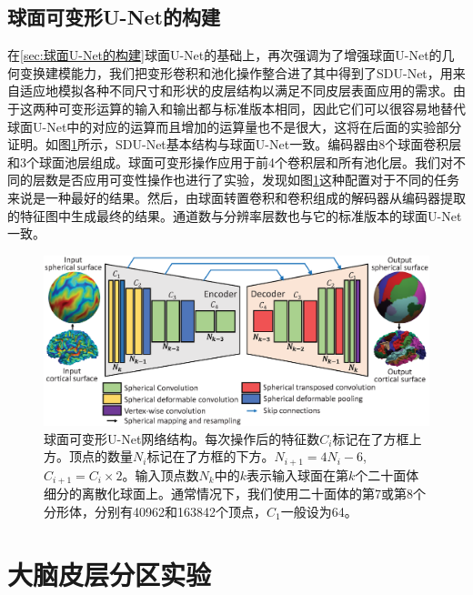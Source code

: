 \subsection{球面可变形U-Net的构建}
在\ref{sec:球面U-Net的构建}球面U-Net的基础上，再次强调为了增强球面U-Net的几何变换建模能力，我们把变形卷积和池化操作整合进了其中得到了SDU-Net，用来自适应地模拟各种不同尺寸和形状的皮层结构以满足不同皮层表面应用的需求。由于这两种可变形运算的输入和输出都与标准版本相同，因此它们可以很容易地替代球面U-Net中的对应的运算而且增加的运算量也不是很大，这将在后面的实验部分证明。如图\ref{fig:fig_sdunet}所示，SDU-Net基本结构与球面U-Net一致。编码器由8个球面卷积层和3个球面池层组成。球面可变形操作应用于前4个卷积层和所有池化层。我们对不同的层数是否应用可变性操作也进行了实验，发现如图\ref{fig:fig_sdunet}这种配置对于不同的任务来说是一种最好的结果。然后，由球面转置卷积和卷积组成的解码器从编码器提取的特征图中生成最终的结果。通道数与分辨率层数也与它的标准版本的球面U-Net一致。

\begin{figure}[t]
	\centering
	\includegraphics[width=0.9\linewidth]{figure/spheircal_deform_cnn}
	\caption{球面可变形U-Net网络结构。每次操作后的特征数$C_i$标记在了方框上方。顶点的数量$N_i$标记在了方框的下方。$N_{i+1}=4N_i-6$, $C_{i+1}=C_i\times 2$。输入顶点数$N_k$中的$k$表示输入球面在第$k$个二十面体细分的离散化球面上。通常情况下，我们使用二十面体的第7或第8个分形体，分别有40962和163842个顶点，$C_1$一般设为64。}
	\label{fig:fig_sdunet}
\end{figure}





\section{大脑皮层分区实验}\label{sec:大脑皮层分区实验}
